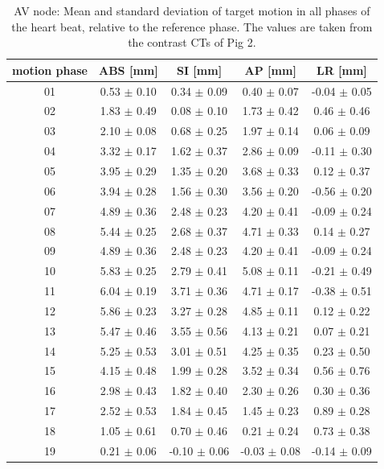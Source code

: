 \documentclass[type=dr, dr=rernat, accentcolor=tud7b,colorbacktitle, bigchapter, openright, twoside, 12pt ]{tudthesis}
\begin{document}
\newpage

\begin{table}[htbp]
  \centering
  \caption{AV node: Mean and standard deviation of target motion in all phases of the heart beat, relative to the reference phase. The values are 
  taken from the contrast CTs of Pig 2.}
  \begin{tabular}{|c|c|c|c|c|}
    \hline\hline
    motion phase\rule{0pt}{2.6ex}\rule[-1.2ex]{0pt}{0pt} & ABS [mm] & SI [mm] & AP [mm] & LR [mm]\\
    \hline
01 &0.53 $\pm$ 0.10 &0.34 $\pm$ 0.09 &0.40 $\pm$ 0.07 &-0.04 $\pm$ 0.05 \\
02 &1.83 $\pm$ 0.49 &0.08 $\pm$ 0.10 &1.73 $\pm$ 0.42 &0.46 $\pm$ 0.46 \\
03 &2.10 $\pm$ 0.08 &0.68 $\pm$ 0.25 &1.97 $\pm$ 0.14 &0.06 $\pm$ 0.09 \\
04 &3.32 $\pm$ 0.17 &1.62 $\pm$ 0.37 &2.86 $\pm$ 0.09 &-0.11 $\pm$ 0.30 \\
05 &3.95 $\pm$ 0.29 &1.35 $\pm$ 0.20 &3.68 $\pm$ 0.33 &0.12 $\pm$ 0.37 \\
06 &3.94 $\pm$ 0.28 &1.56 $\pm$ 0.30 &3.56 $\pm$ 0.20 &-0.56 $\pm$ 0.20 \\
07 &4.89 $\pm$ 0.36 &2.48 $\pm$ 0.23 &4.20 $\pm$ 0.41 &-0.09 $\pm$ 0.24 \\
08 &5.44 $\pm$ 0.25 &2.68 $\pm$ 0.37 &4.71 $\pm$ 0.33 &0.14 $\pm$ 0.27 \\
09 &4.89 $\pm$ 0.36 &2.48 $\pm$ 0.23 &4.20 $\pm$ 0.41 &-0.09 $\pm$ 0.24 \\
10 &5.83 $\pm$ 0.25 &2.79 $\pm$ 0.41 &5.08 $\pm$ 0.11 &-0.21 $\pm$ 0.49 \\
11 &6.04 $\pm$ 0.19 &3.71 $\pm$ 0.36 &4.71 $\pm$ 0.17 &-0.38 $\pm$ 0.51 \\
12 &5.86 $\pm$ 0.23 &3.27 $\pm$ 0.28 &4.85 $\pm$ 0.11 &0.12 $\pm$ 0.22 \\
13 &5.47 $\pm$ 0.46 &3.55 $\pm$ 0.56 &4.13 $\pm$ 0.21 &0.07 $\pm$ 0.21 \\
14 &5.25 $\pm$ 0.53 &3.01 $\pm$ 0.51 &4.25 $\pm$ 0.35 &0.23 $\pm$ 0.50 \\
15 &4.15 $\pm$ 0.48 &1.99 $\pm$ 0.28 &3.52 $\pm$ 0.34 &0.56 $\pm$ 0.76 \\
16 &2.98 $\pm$ 0.43 &1.82 $\pm$ 0.40 &2.30 $\pm$ 0.26 &0.30 $\pm$ 0.36 \\
17 &2.52 $\pm$ 0.53 &1.84 $\pm$ 0.45 &1.45 $\pm$ 0.23 &0.89 $\pm$ 0.28 \\
18 &1.05 $\pm$ 0.61 &0.70 $\pm$ 0.46 &0.21 $\pm$ 0.24 &0.73 $\pm$ 0.38 \\
19 &0.21 $\pm$ 0.06 &-0.10 $\pm$ 0.06 &-0.03 $\pm$ 0.08 &-0.14 $\pm$ 0.09 \\
    \hline\hline
  \end{tabular}
  \label{tab:motion:AV:Pig2}
\end{table}
\end{document}

